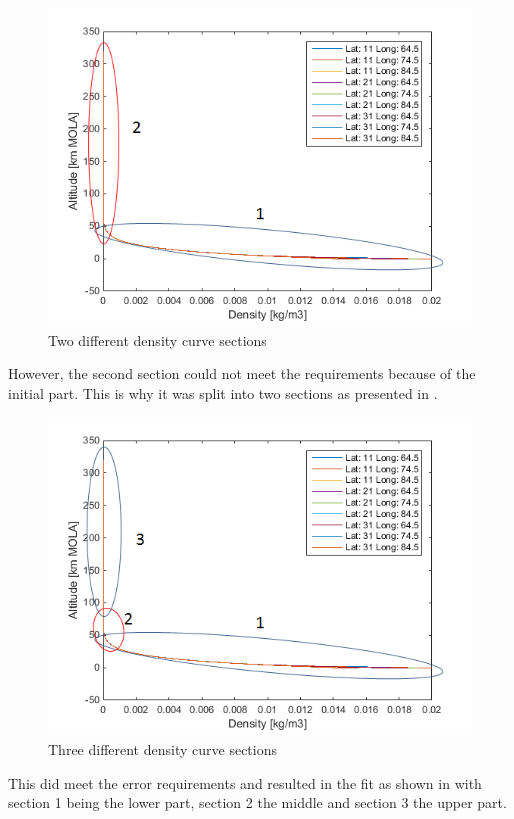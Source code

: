 \begin{figure}[!ht]
\centering
\includegraphics[width=0.9 \textwidth]{figures/software/densityDataSplit2.png}
\caption{Two different density curve sections}
\label{fig:densityDataSplit2}
\end{figure}

However, the second section could not meet the requirements because of the initial part. This is why it was split into two sections as presented in .

\begin{figure}[!ht]
\centering
\includegraphics[width=0.9 \textwidth]{figures/software/densityDataSplit3.png}
\caption{Three different density curve sections}
\label{fig:densityDataSplit3}
\end{figure}

This did meet the error requirements and resulted in the fit as shown in  with section 1 being the lower part, section 2 the middle and section 3 the upper part.

